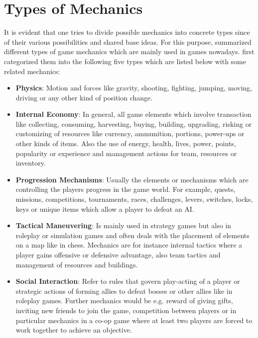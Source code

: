 \documentclass[MGS,Master,english]{twbook}%
\begin{document}
\section{Types of Mechanics}
It is evident that one tries to divide possible mechanics into concrete types since of their various possibilities and shared base ideas. For this purpose, \citep{gameDesign::gameMechanicsAdvancedGameDesign} summarized different types of game mechanics which are mainly used in games nowadays.  first categorized them into the following five types which are listed below with some related mechanics:
\begin{itemize}
	\item \textbf{Physics}: Motion and forces like gravity, shooting, fighting, jumping, moving, driving or any other kind of position change. \cite{gameDesign::gameMechanicsAdvancedGameDesign}
	\item \textbf{Internal Economy}: In general, all game elements which involve transaction like collecting, consuming, harvesting, buying, building, upgrading, risking or customizing of resources like currency, ammunition, portions, power-ups or other kinds of items. Also the use of energy, health, lives, power, points, popularity or experience and management actions for team, resources or inventory. \cite{gameDesign::gameMechanicsAdvancedGameDesign}
	\item \textbf{Progression Mechanisms}: Usually the elements or mechanisms which are controlling the players progress in the game world. For example, quests, missions, competitions, tournaments, races, challenges, levers, switches, locks, keys or unique items which allow a player to defeat an AI. \cite{gameDesign::gameMechanicsAdvancedGameDesign}
	\item \textbf{Tactical Maneuvering}: Is mainly used in strategy games but also in roleplay or simulation games and often deals with the placement of elements on a map like in chess. Mechanics are for instance internal tactics where a player gains offensive or defensive advantage, also team tactics and management of resources and buildings. \cite{gameDesign::gameMechanicsAdvancedGameDesign}
	\item \textbf{Social Interaction}: Refer to rules that govern play-acting of a player or strategic actions of forming allies to defeat bosses or other allies like in roleplay games. Further mechanics would be e.g. reward of giving gifts, inviting new friends to join the game, competition between players or in particular mechanics in a co-op game where at least two players are forced to work together to achieve an objective. \cite{gameDesign::gameMechanicsAdvancedGameDesign}
\end{itemize}
\end{document}
